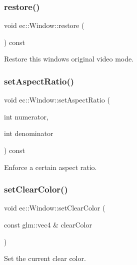 \subsubsection{\texorpdfstring{restore()}{restore()}}
{\footnotesize\ttfamily void ec\+::\+Window\+::restore (\begin{DoxyParamCaption}{ }\end{DoxyParamCaption}) const}

Restore this windows original video mode. \mbox{\label{classec_1_1_window_abe49e52c64cce2e71ba17f25521d00eb}} 
\subsubsection{\texorpdfstring{set\+Aspect\+Ratio()}{setAspectRatio()}}
{\footnotesize\ttfamily void ec\+::\+Window\+::set\+Aspect\+Ratio (\begin{DoxyParamCaption}\item[{int}]{numerator,  }\item[{int}]{denominator }\end{DoxyParamCaption}) const}

Enforce a certain aspect ratio. \mbox{\label{classec_1_1_window_a915c4b64dde5f2274e59c40bc10eff58}} 
\subsubsection{\texorpdfstring{set\+Clear\+Color()}{setClearColor()}}
{\footnotesize\ttfamily void ec\+::\+Window\+::set\+Clear\+Color (\begin{DoxyParamCaption}\item[{const glm\+::vec4 \&}]{clear\+Color }\end{DoxyParamCaption})}

Set the current clear color. \mbox{\label{classec_1_1_window_a2285600c974d0a2381f84cef3899822f}} 
